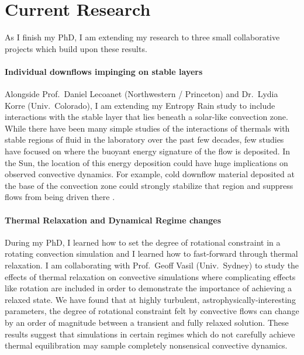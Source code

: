 \documentclass[preprint, hmargin=1in, vmargin=1in]{aastex62}
\begin{document}
\section*{\textbf{Current Research}}
As I finish my PhD, I am extending my research to three small collaborative projects which build upon these results.

\vspace{-4pt}
\paragraph{Individual downflows impinging on stable layers}
Alongside Prof.~Daniel Lecoanet (Northwestern / Princeton) and Dr.~Lydia Korre (Univ.~Colorado), I am extending my Entropy Rain study to include interactions with the stable layer that lies beneath a solar-like convection zone.
While there have been many simple studies of the interactions of thermals with stable regions of fluid in the laboratory over the past few decades, few studies have focused on where the buoyant energy signature of the flow is deposited.
In the Sun, the location of this energy deposition could have huge implications on observed convective dynamics.
For example, cold downflow material deposited at the base of the convection zone could strongly stabilize that region and suppress flows from being driven there \citep{cossette&rast2017}.

\vspace{-4pt}
\paragraph{Thermal Relaxation and Dynamical Regime changes}
During my PhD, I learned how to set the degree of rotational constraint in a rotating convection simulation and I learned how to fast-forward through thermal relaxation.
I am collaborating with Prof.~Geoff Vasil (Univ.~Sydney) to study the effects of thermal relaxation on convective simulations where complicating effects like rotation are included in order to demonstrate the importance of achieving a relaxed state.
We have found that at highly turbulent, astrophysically-interesting parameters, the degree of rotational constraint felt by convective flows can change by an order of magnitude between a transient and fully relaxed solution.
These results suggest that simulations in certain regimes which do not carefully achieve thermal equilibration may sample completely nonsensical convective dynamics.

\vspace{-4pt}
\end{document}
